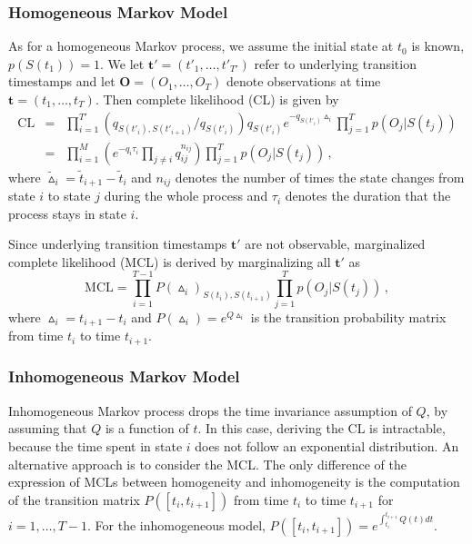 \documentclass{article}
\begin{document}
\subsubsection{Homogeneous Markov Model} \label{sec:homogeneous}
As for a homogeneous Markov process, we assume the initial state at $t_0$ is known, $p(S(t_1)) = 1$. We let $\bm t' = (t'_1, \ldots, t'_{T'})$ refer to underlying transition timestamps and let $\bm O = (O_1, \ldots, O_T)$ denote observations at time $\bm t = (t_1, \ldots, t_T)$. Then complete likelihood (CL) is given by 
\begin{eqnarray}
\mathrm{CL} & = & \prod_{i = 1}^{T'}(q_{S(t'_i),S(t'_{i+1})}/q_{S(t'_i)})q_{S(t'_i)}e^{-q_{S(t'_i)}\vartriangle_i} \prod_{j = 1}^Tp(O_j|S(t_j)) \nonumber\\
& = & \prod_{i = 1}^{M}\left(e^{-q_i\tau_i} \prod_{j\neq i} q_{ij}^{n_{ij}}\right)\prod_{j=1}^Tp(O_j|S(t_j))\,,
\label{CL}
\end{eqnarray}
where $\tilde{\vartriangle}_i = \tilde{t}_{i+1} - \tilde{t}_i$ and $n_{ij}$ denotes the number of times the state changes from state $i$ to state $j$ during the whole process and $\tau_i$ denotes the duration that the process stays in state $i$.

Since underlying transition timestamps $\bm t'$ are not observable, marginalized complete likelihood (MCL) is derived by marginalizing all $\bm t'$ as
\begin{equation*}
\mathrm{MCL} = \prod_{i = 1}^{T-1}P(\vartriangle_i)_{S(t_i), S(t_{i+1})}\prod_{j = 1}^T p(O_j|S(t_j)) \,,
\end{equation*}
where $\vartriangle_i = t_{i+1} - t_i$ and $P(\vartriangle_i) = e^{Q \vartriangle_i }$ is the transition probability matrix from time $t_i$ to time $t_{i+1}$.  

\subsubsection{Inhomogeneous Markov Model} \label{sec:inhomogeneous}

Inhomogeneous Markov process drops the time invariance assumption of $Q$, by assuming that $Q$ is a function of $t$. In this case, deriving the CL is intractable, because the time spent in state $i$ does not follow an exponential distribution. An alternative approach is to consider the MCL. The only difference of the expression of MCLs between homogeneity and inhomogeneity is the computation of the transition matrix $P([t_i, t_{i+1}])$ from time $t_i$ to time $t_{i+1}$ for $i = 1, \ldots, T - 1$. For the inhomogeneous model, $P([t_i, t_{i+1}]) = e^{\int _{t_i}^{t_{i+1}}Q(t)dt}$.
\end{document}
